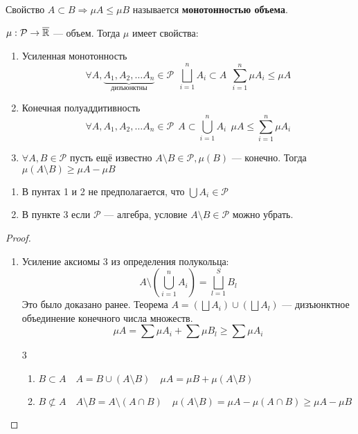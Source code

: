 \begin{definition}
    Свойство \(A\subset B \Rightarrow \mu A \le \mu B\) называется \textbf{монотонностью объема}.
\end{definition}

\begin{theorem}
    \(\mu : \mathcal{P} \to \overline {\mathbb{R}}\) --- объем. Тогда \(\mu\) имеет свойства:
    \begin{enumerate}
        \item Усиленная монотонность
              \[\forall A, \underbrace{A_1, A_2, \dots A_n}_{\text{дизъюнктны}} \in \mathcal{P} \ \ \bigsqcup_{i = 1}^n A_i \subset A \ \ \sum_{i = 1}^n \mu A_i \le \mu A\]
        \item Конечная полуаддитивность
              \[\forall A, A_1, A_2, \dots A_n \in \mathcal{P} \ \ A\subset \bigcup_{i = 1}^n A_i \ \ \mu A \le \sum_{i = 1}^n \mu A_i\]
        \item \(\forall A, B \in \mathcal{P}\) пусть ещё известно \(A\setminus B \in \mathcal{P}, \mu(B)\) --- конечно. Тогда \(\mu(A\setminus B) \ge \mu A - \mu B\)
    \end{enumerate}
\end{theorem}

\begin{remark}
    \begin{enumerate}
        \item В пунтах 1 и 2 не предполагается, что \(\bigcup A_i \in \mathcal{P}\)
        \item В пункте 3 если \(\mathcal{P}\) --- алгебра, условие \(A\setminus B\in \mathcal{P}\) можно убрать.
    \end{enumerate}
\end{remark}

\begin{proof}\itemfix
    \begin{enumerate}
        \item Усиление аксиомы 3 из определения полукольца:
              \[A\setminus \left( \bigcup_{i = 1}^n A_i \right) = \bigsqcup_{l = 1}^S B_l\]
              Это было доказано ранее.
              Теорема \? \(A = \left( \bigsqcup A_i \right) \cup \left( \bigsqcup A_l \right)\) --- дизъюнктное объединение конечного числа множеств.
              \[\mu A = \sum \mu A_i + \sum \mu B_l \ge \sum \mu A_i\]
        \item [3] \begin{enumerate}
                  \item \(B \subset A \quad A = B \cup (A\setminus B) \quad \mu A = \mu B + \mu(A\setminus B)\)
                  \item \(B \not\subset A \quad A\setminus B = A\setminus (A\cap B) \quad \mu(A\setminus B) = \mu A - \mu(A\cap B) \ge \mu A - \mu B\)
              \end{enumerate}
    \end{enumerate}
\end{proof}

